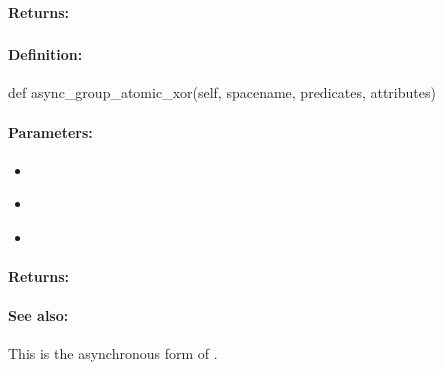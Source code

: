 \paragraph{Returns:}


\pagebreak
\subsubsection{}
\label{api:python:async_group_atomic_xor}


\paragraph{Definition:}
\begin{pythoncode}
def async_group_atomic_xor(self, spacename, predicates, attributes)
\end{pythoncode}

\paragraph{Parameters:}
\begin{itemize}[noitemsep]
\item {}\\

\item {}\\

\item {}\\

\end{itemize}

\paragraph{Returns:}


\paragraph{See also:}  This is the asynchronous form of .

\pagebreak
